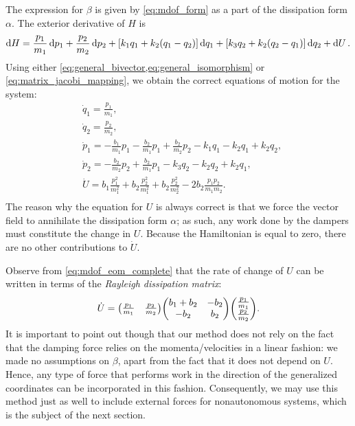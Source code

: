  The expression for \(\beta\) is given by \cref{eq:mdof_form} as a part of the dissipation form \(\alpha\). The exterior derivative of \(H\) is 
     \begin{equation}
     \dd{H} = \frac{p_1}{m_1}\dd{p_1} + \frac{p_2}{m_2}\dd{p_2} +  \qty[k_1q_1 + k_2(q_1 - q_2)]\dd{q_1} + \qty[k_3q_2 + k_2(q_2 - q_1)]\dd{q_2} + \dd{U}.
\end{equation}
 Using either \cref{eq:general_bivector,eq:general_isomorphism} or \cref{eq:matrix_jacobi_mapping}, we obtain the correct equations of motion for the system:
 \begin{equation}
     \begin{split}
         &\dot{q}_1 = \frac{p_1}{m_1}, \\
         &\dot{q}_2 = \frac{p_2}{m_2}, \\
         &\dot{p}_1 = -\frac{b_1}{m_1}p_1 - \frac{b_2}{m_1}p_1 + \frac{b_2}{m_2}p_2 - k_1 q_1 - k_2 q_1 + k_2 q_2, \\
         &\dot{p}_2 =  - \frac{b_2}{m_2}p_2 + \frac{b_2}{m_1}p_1 - k_3 q_2 - k_2 q_2 + k_2 q_1, \\
         &\dot{U} = b_1\frac{p_1^2}{m_1^2} + b_2\frac{p_2^2}{m_1^2} +  b_2\frac{p_2^2}{m_2^2} - 2b_2 \frac{p_1 p_2}{m_1 m_2}. \\
     \end{split}
     \label{eq:mdof_eom_complete}
 \end{equation}
The reason why the equation for \(U\) is always correct is that we force the vector field to annihilate the dissipation form \(\alpha\); as such, any work done by the dampers must constitute the change in \(U\). Because the Hamiltonian is equal to zero, there are no other contributions to \(\dot{U}\). 

Observe from \cref{eq:mdof_eom_complete} that the rate of change of \(U\) can be written in terms of the \emph{Rayleigh dissipation matrix}:
\begin{equation}
     \dot{U} = \mqty(\tfrac{p_1}{m_1} & \tfrac{p_2}{m_2}) \mqty(b_1 + b_2 & -b_2 \\ -b_2 & b_2) \mqty(\tfrac{p_1}{m_1} \\ \tfrac{p_2}{m_2}).
\end{equation}
It is important to point out though that our method does not rely on the fact that the damping force relies on the momenta/velocities in a linear fashion: we made no assumptions on \(\beta\), apart from the fact that it does not depend on \(U\). Hence, any type of force that performs work in the direction of the generalized coordinates can be incorporated in this fashion. Consequently, we may use this method just as well to include external forces for nonautonomous systems, which is the subject of the next section.

